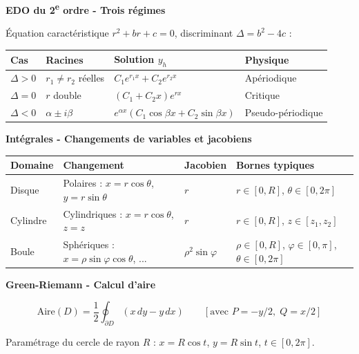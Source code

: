 \documentclass[11pt,a4paper]{article}
\begin{document}
\vspace{6pt}

\begin{methodebox}
\textbf{EDO du 2\textsuperscript{e} ordre - Trois régimes}

Équation caractéristique $r^2 + br + c = 0$, discriminant $\Delta = b^2 - 4c$ :

\vspace{4pt}
\begin{center}
\begin{tabular}{@{}llll@{}}
\toprule
Cas & Racines & Solution $y_h$ & Physique\\
\midrule
$\Delta > 0$ & $r_1 \neq r_2$ réelles & $C_1e^{r_1x} + C_2e^{r_2x}$ & Apériodique\\
$\Delta = 0$ & $r$ double & $(C_1 + C_2x)e^{rx}$ & Critique\\
$\Delta < 0$ & $\alpha \pm i\beta$ & $e^{\alpha x}(C_1\cos\beta x + C_2\sin\beta x)$ & Pseudo-périodique\\
\bottomrule
\end{tabular}
\end{center}
\end{methodebox}

\vspace{6pt}

\begin{methodebox}
\textbf{Intégrales - Changements de variables et jacobiens}

\vspace{4pt}
\begin{center}
\begin{tabular}{@{}llll@{}}
\toprule
Domaine & Changement & Jacobien & Bornes typiques\\
\midrule
Disque & Polaires : $x=r\cos\theta$, $y=r\sin\theta$ & $r$ & $r\in[0,R]$, $\theta\in[0,2\pi]$\\
Cylindre & Cylindriques : $x=r\cos\theta$, $z=z$ & $r$ & $r\in[0,R]$, $z\in[z_1,z_2]$\\
Boule & Sphériques : $x=\rho\sin\varphi\cos\theta$, ... & $\rho^2\sin\varphi$ & $\rho\in[0,R]$, $\varphi\in[0,\pi]$, $\theta\in[0,2\pi]$\\
\bottomrule
\end{tabular}
\end{center}
\end{methodebox}

\vspace{6pt}

\begin{methodebox}
\textbf{Green-Riemann - Calcul d'aire}

$$\mathrm{Aire}(D) = \frac{1}{2}\oint_{\partial D}(x\,dy - y\,dx) \qquad [\text{avec } P=-y/2,\; Q=x/2]$$

Paramétrage du cercle de rayon $R$ : $x = R\cos t$, $y = R\sin t$, $t\in[0,2\pi]$.
\end{methodebox}
\end{document}
